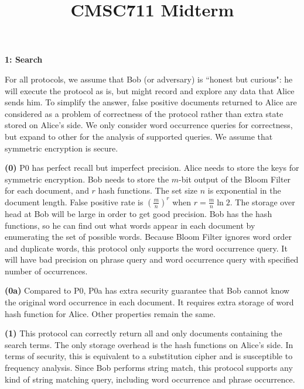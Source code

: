 \documentclass[10pt]{article}
\title{CMSC711 Midterm}
\newcommand\question[2]{\vspace{.1in}\textbf{#1: #2}\vspace{.5em}\vspace{.10in}}
\renewcommand\part[1]{\vspace{.10in}\textbf{(#1)}}
\begin{document}
\raggedright
\newcommand\NAME{Shi Feng}

\question{1}{Search}

For all protocols, we assume that Bob (or adversary) is ``honest but curious": he
will execute the protocol as is, but might record and explore any data that
Alice sends him. To simplify the answer, false positive documents returned to
Alice are considered as a problem of correctness of the protocol rather than extra
state stored on Alice's side. We only consider word occurrence queries for
correctness, but expand to other for the analysis of supported queries. We
assume that symmetric encryption is secure.

\part{0}
P0 has perfect recall but imperfect precision.
Alice needs to store the keys for symmetric encryption. Bob needs to store the
$m$-bit output of the Bloom Filter for each document, and $r$ hash functions.
The set size $n$ is exponential in the document length.  False positive rate is
$(\frac{m}{n})^r$ when $r=\frac{m}{n}\ln 2$. The storage over head at Bob will
be large in order to get good precision.
Bob has the hash functions, so he can find out what words appear
in each document by enumerating the set of possible words. Because Bloom Filter
ignores word order and duplicate words, this protocol only supports the word
occurrence query. It will have bad precision on phrase query and word occurrence
query with specified number of occurrences.

\part{0a}
Compared to P0, P0a has extra security guarantee that Bob cannot know the
original word occurrence in each document.
It requires extra storage of word hash function for Alice.
Other properties remain the same.

\part{1}
This protocol can correctly return all and only documents containing the search
terms. 
The only storage overhead is the hash functions on Alice's side. 
In terms of security, this is equivalent to a substitution cipher and is
susceptible to frequency analysis.
Since Bob performs string match, this protocol supports any kind of string
matching query, including word occurrence and phrase occurrence.
\end{document}
